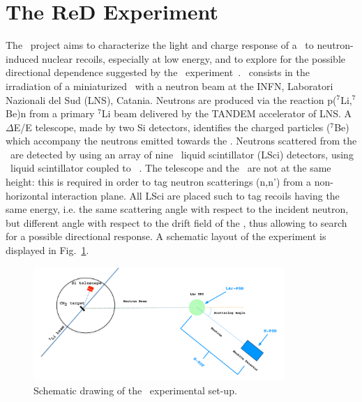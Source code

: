 \section{The R\lowercase{e}D Experiment}
\label{sec:Red}

The \ReD\ project aims to characterize the light and charge response of a \LArTPC\ to 
neutron-induced nuclear recoils, especially at low energy, and to explore for the possible 
directional dependence suggested by the \SCENE\  experiment~\cite{Alexander:2013ke,Cao:2015ks}. 
\ReD\ consists in the irradiation of a miniaturized \LArTPC\ with a neutron beam at the 
INFN, Laboratori Nazionali del Sud (LNS), Catania. 
Neutrons are produced via the reaction p($^{7}$Li,$^7$Be)n from a primary $^{7}$Li beam 
delivered by the TANDEM accelerator of LNS. A $\Delta$E/E telescope, made by two 
Si detectors, identifies the charged particles ($^{7}$Be) which accompany the 
neutrons emitted towards the \TPC. Neutrons scattered from the \TPC\ are detected by 
using an array of nine \RedLNSNeutronSpectrometerDetectorsPMTsDiameter\ liquid scintillator 
(LSci) detectors,  using \RedLNSNeutronSpectrometerDetectorsScintillatorType\ liquid 
scintillator coupled to \RedLNSNeutronSpectrometerDetectorsPMTsType\ \PMTs.  The  
telescope and the \TPC\ are not at the same height: this is required in order to tag 
neutron scatterings (n,n') from a non-horizontal interaction plane. All LSci are placed 
such to tag recoils having the same energy, i.e. the same scattering angle with respect 
to the incident neutron, but different angle with respect to the drift field of 
the \LArTPC, thus allowing to search for a possible directional response. A schematic 
layout of the experiment is displayed in Fig.~\ref{fig:ReD-sketch}. \\
\begin{figure}
\centering
\includegraphics[width=0.85\textwidth]{./Figures/ReD-Sketch.pdf} 
\caption{Schematic drawing of the \ReD\ experimental set-up.}
\label{fig:ReD-sketch}
\end{figure}

